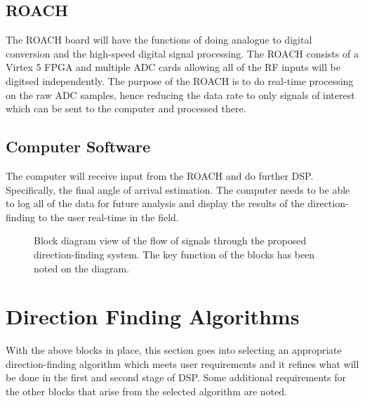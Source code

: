 \subsection{ROACH}
The ROACH board will have the functions of doing analogue to digital conversion and the high-speed digital signal processing. The ROACH consists of a Virtex 5 FPGA and multiple ADC cards allowing all of the RF inputs will be digitsed independently. The purpose of the ROACH is to do real-time processing on the raw ADC samples, hence reducing the data rate to only signals of interest which can be sent to the computer and processed there.

\subsection{Computer Software}
The computer will receive input from the ROACH and do further DSP. Specifically, the final angle of arrival estimation. The computer needs to be able to log all of the data for future analysis and display the results of the direction-finding to the user real-time in the field.


\begin{landscape}
  \thispagestyle{empty}
  \begin{figure}
    \centering
  \caption{Block diagram view of the flow of signals through the proposed direction-finding system. The key function of the blocks has been noted on the diagram. }
  \label{fig:system-design:signal-flow}
  \end{figure}
\end{landscape}

\section{Direction Finding Algorithms}
With the above blocks in place, this section goes into selecting an appropriate direction-finding algorithm which meets user requirements and it refines what will be done in the first and second stage of DSP. Some additional requirements for the other blocks that arise from the selected algorithm are noted. 

